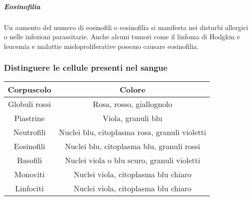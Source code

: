				\subparagraph{Eosinofilia}
				Un aumento del numero di eosinofili o eosinofilia si manifesta nei disturbi allergici o nelle infezioni parassitarie. 
				Anche alcuni tumori come il linfoma di Hodgkin e leucemia e malattie mieloproliferative possono causare eosinofilia.
		\subsubsection{Distinguere le cellule presenti nel sangue}
		\begin{center}
			\begin{tabular}{|c|c|}
				\hline
				Corpuscolo & Colore \\
				\hline
				Globuli rossi & Rosa, rosso, giallognolo \\
				\hline
				Piastrine & Viola, granuli blu \\
				\hline
				Neutrofili & Nuclei blu, citoplasma rosa, granuli violetti\\
				\hline
				Eosinofili &  Nuclei blu, citoplasma blu, granuli rossi\\
				\hline
				Basofili &  Nuclei viola o blu scuro, granuli violetti\\
				\hline
				Monociti &  Nuclei viola, citoplasma blu chiaro\\
				\hline
				Linfociti &  Nuclei viola, citoplasma blu chiaro\\
				\hline
			\end{tabular}
		\end{center}

